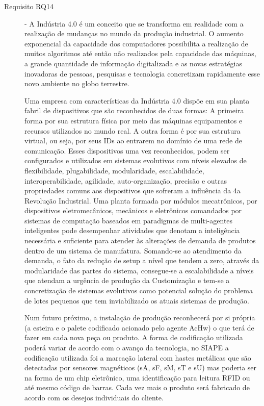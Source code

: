 \begin{description}
	\item[Requisito RQ14] - A Indústria 4.0 é um conceito que se transforma em realidade com a realização de mudanças no mundo da produção industrial. O aumento exponencial da capacidade dos computadores possibilita a realização de muitos algoritmos até então não realizados pela capacidade das máquinas, a grande quantidade de informação digitalizada e as novas estratégias inovadoras de pessoas, pesquisas e tecnologia concretizam rapidamente esse novo ambiente no globo terrestre.\par 	
Uma empresa com características da Indústria 4.0 dispõe em sua planta fabril de dispositivos que são reconhecidos de duas formas: A primeira forma por sua estrutura física por meio das máquinas equipamentos e recursos utilizados no mundo real. A outra forma é por sua estrutura virtual, ou seja,  por seus IDs ao entrarem no domínio de uma rede de comunicação. Esses dispositivos uma vez reconhecidos, podem ser configurados e utilizados em sistemas evolutivos com níveis elevados de flexibilidade, plugabilidade, modularidade, escalabilidade, interoperabilidade, agilidade, auto-organização, precisão e outras propriedades comuns aos dispositivos que sofreram a influência da 4a Revolução Industrial. Uma planta formada por módulos mecatrônicos, por dispositivos eletromecânicos, mecânicos e eletrônicos comandados por sistemas de computação baseados em paradigmas de multi-agentes inteligentes pode desempenhar atividades que denotam a inteligência necessária e suficiente para atender às alterações de demanda de produtos dentro de um sistema de manufatura. Somando-se ao atendimento da demanda, o fato da redução de setup a nível que tendem a zero, através da modularidade das partes do sistema, consegue-se a escalabilidade a níveis que atendam a urgência de produção da Customização e tem-se a concretização de sistemas evolutivos como potencial solução do problema de lotes pequenos que tem inviabilizado os atuais sistemas de produção. \par

Num futuro próximo, a instalação de produção reconhecerá por si própria (a esteira e o palete codificado acionado pelo agente AcHw) o que terá de fazer em cada nova peça ou produto. A forma de codificação utilizada poderá variar de acordo com o avanço da tecnologia, no SIAPE a codificação utilizada foi a marcação lateral com hastes metálicas que são detectadas por sensores magnéticos (sA, sF, sM, sT e sU) mas poderia ser na forma de um chip eletrônico, uma identificação para leitura RFID ou até mesmo código de barras. Cada vez mais o produto será fabricado de acordo com os desejos individuais do cliente.


\end{description}
